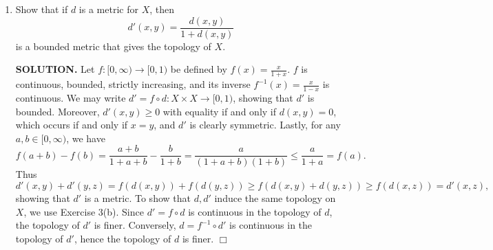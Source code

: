 \documentclass{article}
\begin{document}
\begin{enumerate}
    \item Show that if $d$ is a metric for $X$, then
    $$d'(x, y) = \frac{d(x, y)}{1+d(x, y)}$$
    is a bounded metric that gives the topology of $X$.

    {\bf SOLUTION.} Let $f: [0, \infty) \rightarrow [0, 1)$ be defined by $f(x) = \frac{x}{1+x}$. $f$ is continuous, bounded, strictly increasing, and its inverse $f^{-1}(x) = \frac{x}{1-x}$ is continuous. We may write $d' = f \circ d: X \times X \rightarrow [0, 1)$, showing that $d'$ is bounded. Moreover, $d'(x, y) \geq 0$ with equality if and only if $d(x, y) = 0$, which occurs if and only if $x = y$, and $d'$ is clearly symmetric. Lastly, for any $a, b \in [0, \infty)$, we have
    $$f(a+b) - f(b) = \frac{a+b}{1+a+b} - \frac{b}{1+b} = \frac{a}{(1+a+b)(1+b)} \leq \frac{a}{1+a} = f(a).$$
    Thus
    $$d'(x, y) + d'(y, z) = f(d(x, y)) + f(d(y, z)) \geq f(d(x, y) + d(y, z)) \geq f(d(x, z)) = d'(x, z),$$
    showing that $d'$ is a metric. To show that $d, d'$ induce the same topology on $X$, we use Exercise 3(b). Since $d' = f \circ d$ is continuous in the topology of $d$, the topology of $d'$ is finer. Conversely, $d = f^{-1} \circ d'$ is continuous in the topology of $d'$, hence the topology of $d$ is finer. $\Box$
\end{enumerate}
\end{document}
